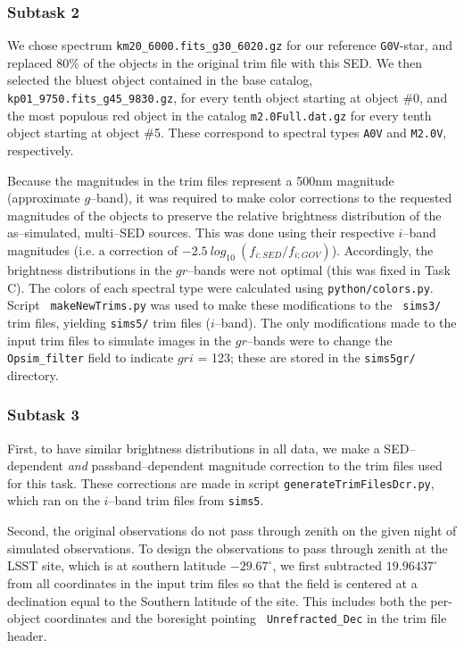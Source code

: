 \documentclass[prd, nofootinbib, floatfix, 11pt, tightenlines, times]{article}
\begin{document}
\begin{appendices}
\subsubsection{Subtask 2}

We chose spectrum {\tt km20\_6000.fits\_g30\_6020.gz} for our
reference {\tt G0V}-star, and replaced 80\% of the objects in the
original trim file with this SED.  We then selected the bluest object
contained in the base catalog, {\tt kp01\_9750.fits\_g45\_9830.gz},
for every tenth object starting at object \#0, and the most populous
red object in the catalog {\tt m2.0Full.dat.gz} for every tenth object
starting at object \#5.  These correspond to spectral types {\tt A0V}
and {\tt M2.0V}, respectively.  

Because the magnitudes in the trim files represent a 500nm magnitude
(approximate $g$--band), it was required to make color corrections to
the requested magnitudes of the objects to preserve the relative
brightness distribution of the as--simulated, multi--SED sources.
This was done using their respective $i$--band magnitudes (i.e. a
correction of $-2.5~log_{10}~( f_{i;SED} / f_{i;GOV} )$).
Accordingly, the brightness distributions in the $gr$--bands were not
optimal (this was fixed in Task C).  The colors of each spectral type
were calculated using {\tt python/colors.py}.  Script {\tt
  makeNewTrims.py} was used to make these modifications to the {\tt
  sims3/} trim files, yielding {\tt sims5/} trim files ($i$--band).
The only modifications made to the input trim files to simulate images
in the $gr$--bands were to change the {\tt Opsim\_filter} field to
indicate $gri$ = 123; these are stored in the {\tt sims5gr/}
directory.

\subsubsection{Subtask 3}

First, to have similar brightness distributions in all data, we make a
SED--dependent {\it and} passband--dependent magnitude correction to
the trim files used for this task.  These corrections are made in
script {\tt generateTrimFilesDcr.py}, which ran on the $i$--band trim
files from {\tt sims5}.

Second, the original observations do not pass through zenith on the
given night of simulated observations.  To design the observations to
pass through zenith at the LSST site, which is at southern latitude
$-29.67^{\circ}$, we first subtracted $19.96437^{\circ}$ from all
coordinates in the input trim files so that the field is centered at a
declination equal to the Southern latitude of the site.  This includes
both the per-object coordinates and the boresight pointing {\tt
  Unrefracted\_Dec} in the trim file header.


\end{appendices}
\end{document}
